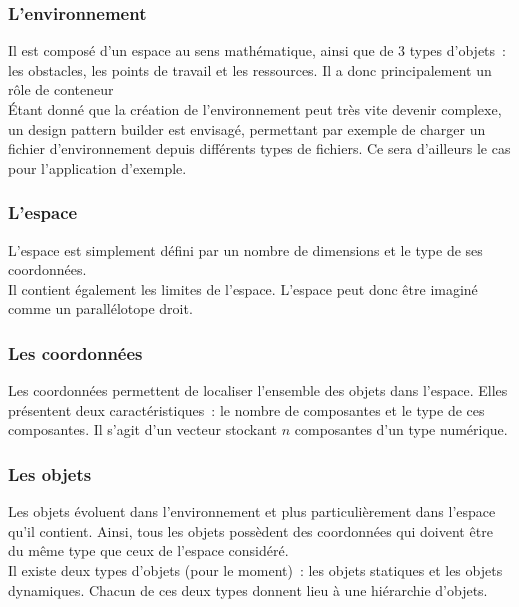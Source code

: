 \subsubsection*{L'environnement}

Il est composé d'un espace au sens mathématique, ainsi que de 3 types d'objets~: les obstacles, les points de travail et les ressources. Il a donc principalement un rôle de conteneur\\

\'Etant donné que la création de l'environnement peut très vite devenir complexe, un design pattern builder est envisagé, permettant par exemple de charger un fichier d'environnement depuis différents types de fichiers.
Ce sera d'ailleurs le cas pour l'application d'exemple.

\subsubsection*{L'espace}

L'espace est simplement défini par un nombre de dimensions et le type de ses coordonnées.\\
Il contient également les limites de l'espace. L'espace peut donc être imaginé comme un parallélotope droit.

\subsubsection*{Les coordonnées}

Les coordonnées permettent de localiser l'ensemble des objets dans l'espace. Elles présentent deux caractéristiques~: le nombre de composantes et le type de ces composantes. Il s'agit d'un vecteur stockant $n$ composantes d'un type numérique.\\

\subsubsection*{Les objets}

Les objets évoluent dans l'environnement et plus particulièrement dans l'espace qu'il contient. Ainsi, tous les objets possèdent des coordonnées qui doivent être du même type que ceux de l'espace considéré.\\
Il existe deux types d'objets (pour le moment)~: les objets statiques et les objets dynamiques. Chacun de ces deux types donnent lieu à une hiérarchie d'objets.\\

